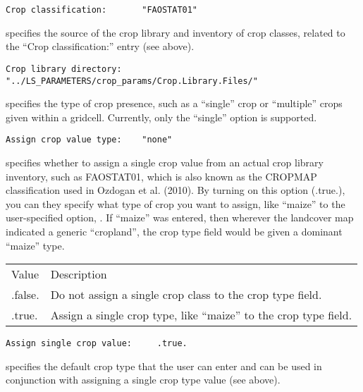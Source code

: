  \begin{Verbatim}[frame=single]
Crop classification:       "FAOSTAT01"  
 \end{Verbatim}

  specifies the source of the
 crop library and inventory of crop classes, related to the 
 ``Crop classification:'' entry (see above).

 \begin{Verbatim}[frame=single]
Crop library directory:  "../LS_PARAMETERS/crop_params/Crop.Library.Files/"
 \end{Verbatim}

  specifies the type of crop presence,
 such as a ``single'' crop or ``multiple'' crops given within a 
 gridcell.  Currently, only the ``single'' option is supported.

 \begin{Verbatim}[frame=single]
Assign crop value type:    "none"
 \end{Verbatim}

 
  specifies whether to assign a single
  crop value from an actual crop library inventory, such as FAOSTAT01,
  which is also known as the CROPMAP classification used in Ozdogan et al. (2010).
  By turning on this option (.true.), you can they specify what type of
  crop you want to assign, like ``maize'' to the user-specified option,
  .  If ``maize'' was entered, then wherever the landcover
  map indicated a generic ``cropland'', the crop type field would be given a
  dominant ``maize'' type.

 \begin{tabular}{ll}
 Value     & Description                                           \\
  .false.  &  Do not assign a single crop class to the crop type field. \\
  .true.   &  Assign a single crop type, like ``maize'' to the crop type field. \\
 \end{tabular}
 

 \begin{Verbatim}[frame=single]
Assign single crop value:     .true.    
 \end{Verbatim}

 
  specifies the default crop type that the
  user can enter and can be used in conjunction with assigning a single
  crop type value (see above).
 

